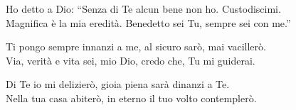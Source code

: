 
\strofa Ho detto a Dio: ``Senza di Te alcun bene non ho. Custodiscimi.\\
Magnifica è la mia eredità. Benedetto sei Tu, sempre sei con me.''

\spazio


\spazio

\strofa Ti pongo sempre innanzi a me, al sicuro sarò, mai vacillerò.\\
Via, verità e vita sei, mio Dio, credo che, Tu mi guiderai.

\spazio


\spazio

\strofa Di Te io mi delizierò, gioia piena sarà dinanzi a Te.\\
Nella tua casa abiterò, in eterno il tuo volto contemplerò.

\spazio

